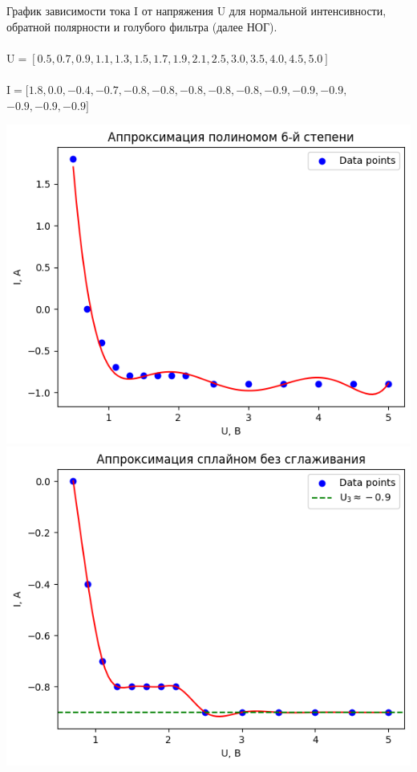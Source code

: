 \documentclass[12pt,openany]{book}
\begin{document}
\newpage

\noindent График зависимости тока I от напряжения U для нормальной интенсивности, 
обратной полярности и голубого фильтра (далее НОГ).\\\\
$\text{U} = [0.5, 0.7, 0.9, 1.1, 1.3, 1.5, 1.7, 1.9, 2.1, 2.5, 3.0, 3.5, 4.0, 4.5, 5.0]$\\\\
$\text{I} = [1.8, 0.0, -0.4, -0.7, -0.8, -0.8, -0.8, -0.8, -0.8, -0.9, -0.9, -0.9,$
$-0.9, -0.9, -0.9]$\\ 

\begin{center}
    \includegraphics[scale=0.59]{K4-NRB1} \\

    \includegraphics[scale=0.59]{K4-NRB2} \\
\end{center}
\end{document}
